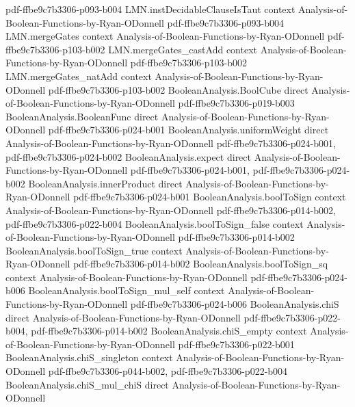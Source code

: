 \begin{lemma}
  {pdf-ffbe9c7b3306-p093-b004}
\proofstep
  {LMN.instDecidableClauseIsTaut}
  {context}
  {Analysis-of-Boolean-Functions-by-Ryan-ODonnell}
  {pdf-ffbe9c7b3306-p093-b004}
\proofstep
  {LMN.mergeGates}
  {context}
  {Analysis-of-Boolean-Functions-by-Ryan-ODonnell}
  {pdf-ffbe9c7b3306-p103-b002}
\proofstep
  {LMN.mergeGates_castAdd}
  {context}
  {Analysis-of-Boolean-Functions-by-Ryan-ODonnell}
  {pdf-ffbe9c7b3306-p103-b002}
\proofstep
  {LMN.mergeGates_natAdd}
  {context}
  {Analysis-of-Boolean-Functions-by-Ryan-ODonnell}
  {pdf-ffbe9c7b3306-p103-b002}
\proofstep
  {BooleanAnalysis.BoolCube}
  {direct}
  {Analysis-of-Boolean-Functions-by-Ryan-ODonnell}
  {pdf-ffbe9c7b3306-p019-b003}
\proofstep
  {BooleanAnalysis.BooleanFunc}
  {direct}
  {Analysis-of-Boolean-Functions-by-Ryan-ODonnell}
  {pdf-ffbe9c7b3306-p024-b001}
\proofstep
  {BooleanAnalysis.uniformWeight}
  {direct}
  {Analysis-of-Boolean-Functions-by-Ryan-ODonnell}
  {pdf-ffbe9c7b3306-p024-b001,
    pdf-ffbe9c7b3306-p024-b002}
\proofstep
  {BooleanAnalysis.expect}
  {direct}
  {Analysis-of-Boolean-Functions-by-Ryan-ODonnell}
  {pdf-ffbe9c7b3306-p024-b001,
    pdf-ffbe9c7b3306-p024-b002}
\proofstep
  {BooleanAnalysis.innerProduct}
  {direct}
  {Analysis-of-Boolean-Functions-by-Ryan-ODonnell}
  {pdf-ffbe9c7b3306-p024-b001}
\proofstep
  {BooleanAnalysis.boolToSign}
  {context}
  {Analysis-of-Boolean-Functions-by-Ryan-ODonnell}
  {pdf-ffbe9c7b3306-p014-b002,
    pdf-ffbe9c7b3306-p022-b004}
\proofstep
  {BooleanAnalysis.boolToSign_false}
  {context}
  {Analysis-of-Boolean-Functions-by-Ryan-ODonnell}
  {pdf-ffbe9c7b3306-p014-b002}
\proofstep
  {BooleanAnalysis.boolToSign_true}
  {context}
  {Analysis-of-Boolean-Functions-by-Ryan-ODonnell}
  {pdf-ffbe9c7b3306-p014-b002}
\proofstep
  {BooleanAnalysis.boolToSign_sq}
  {context}
  {Analysis-of-Boolean-Functions-by-Ryan-ODonnell}
  {pdf-ffbe9c7b3306-p024-b006}
\proofstep
  {BooleanAnalysis.boolToSign_mul_self}
  {context}
  {Analysis-of-Boolean-Functions-by-Ryan-ODonnell}
  {pdf-ffbe9c7b3306-p024-b006}
\proofstep
  {BooleanAnalysis.chiS}
  {direct}
  {Analysis-of-Boolean-Functions-by-Ryan-ODonnell}
  {pdf-ffbe9c7b3306-p022-b004,
    pdf-ffbe9c7b3306-p014-b002}
\proofstep
  {BooleanAnalysis.chiS_empty}
  {context}
  {Analysis-of-Boolean-Functions-by-Ryan-ODonnell}
  {pdf-ffbe9c7b3306-p022-b001}
\proofstep
  {BooleanAnalysis.chiS_singleton}
  {context}
  {Analysis-of-Boolean-Functions-by-Ryan-ODonnell}
  {pdf-ffbe9c7b3306-p044-b002,
    pdf-ffbe9c7b3306-p022-b004}
\proofstep
  {BooleanAnalysis.chiS_mul_chiS}
  {direct}
  {Analysis-of-Boolean-Functions-by-Ryan-ODonnell}

\end{lemma}
